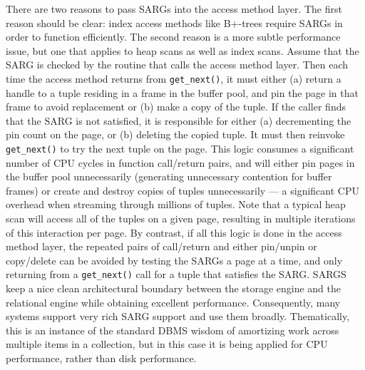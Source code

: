 \documentclass[a4paper,11pt,twoside,openright]{book}
\begin{document}
There are two reasons to pass SARGs into the access method layer. The
first reason should be clear: index access methods like B+-trees require
SARGs in order to function efficiently. The second reason is a more
subtle performance issue, but one that applies to heap scans as well as
index scans. Assume that the SARG is checked by the routine that calls
the access method layer. Then each time the access method returns from
\texttt{get\_next()}, it must either (a) return a handle to a tuple residing in a
frame in the buffer pool, and pin the page in that frame to avoid
replacement or (b) make a copy of the tuple. If the caller finds that
the SARG is not satisfied, it is responsible for either (a) decrementing
the pin count on the page, or (b) deleting the copied tuple. It must
then reinvoke \texttt{get\_next()} to try the next tuple on the page. This logic
consumes a significant number of CPU cycles in function call/return
pairs, and will either pin pages in the buffer pool unnecessarily
(generating unnecessary contention for buffer frames) or create and
destroy copies of tuples unnecessarily --- a significant CPU overhead
when streaming through millions of tuples. Note that a typical heap scan
will access all of the tuples on a given page, resulting in multiple
iterations of this interaction per page. By contrast, if all this logic
is done in the access method layer, the repeated pairs of call/return
and either pin/unpin or copy/delete can be avoided by testing the SARGs
a page at a time, and only returning from a \texttt{get\_next()} call for a tuple
that satisfies the SARG. SARGS keep a nice clean architectural boundary
between the storage engine and the relational engine while obtaining
excellent performance. Consequently, many systems support very rich SARG
support and use them broadly. Thematically, this is an instance of the
standard DBMS wisdom of amortizing work across multiple items in a
collection, but in this case it is being applied for CPU performance,
rather than disk performance.
\end{document}
